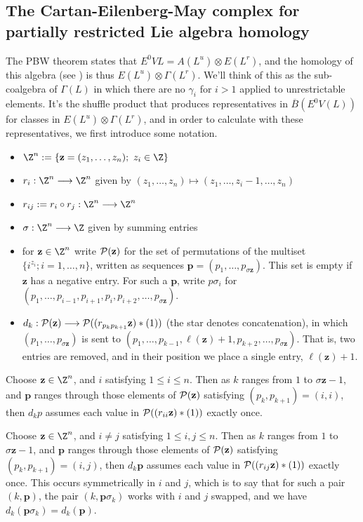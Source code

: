 \documentclass[11pt]{article}
\begin{document}
\begin{PRlieKoszulComplexCalculation}

\subsection{The Cartan-Eilenberg-May complex for partially restricted Lie algebra homology}
The PBW theorem states that $E^0VL=A(L^u)\otimes E(L^r)$, and the homology of this algebra (see \cite[\S7]{PriddyKoszul.pdf}) is thus $E(L^u)\otimes \Gamma(L^r)$. We'll think of this as the sub-coalgebra of $\Gamma(L)$ in which there are no $\gamma_i$ for $i>1$ applied to unrestrictable elements. It's the shuffle product that produces representatives in $\overline{B}(E^0V(L))$ for classes in $E(L^u)\otimes \Gamma(L^r)$, and in order to calculate with these representatives, we first introduce some notation.
\begin{itemize}
\setlength{\parindent}{.25in}
\item $\Z^n:=\{\textbf{z}=(z_1,\ldots,z_n);\ z_i\in\Z\}$
\item $r_i:\Z^n\to\Z^n$ given by $(z_1,\ldots,z_n)\mapsto(z_1,\ldots,z_i-1,\ldots,z_n)$
\item $r_{ij}:=r_i\circ r_j:\Z^n\to\Z^n$
\item $\sigma:\Z^n\to\Z$ given by summing entries
\item for $\textbf{z}\in\Z^n$ write $\mathcal{P}(\textbf{z})$ for the set of permutations of the multiset $\{i^{z_i};i=1,\ldots,n\}$, written as sequences $\textbf{p}=(p_1,\ldots,p_{\sigma \textbf{z}})$. This set is empty if $\textbf{z}$ has a negative entry. For such a $\textbf{p}$, write $p\sigma_i$ for $(p_1,\ldots,p_{i-1},p_{i+1},p_{i},p_{i+2},\ldots,p_{\sigma \textbf{z}})$.
\item $d_k:\mathcal{P}(\textbf{z})\longrightarrow\mathcal{P}((r_{p_kp_{k+1}}\textbf{z})*(1))$ (the star denotes concatenation), in which $(p_1,\ldots,p_{\sigma \textbf{z}})$ is sent to $(p_1,\ldots,p_{k-1},\ell(\textbf{z})+1,p_{k+2},\ldots,p_{\sigma \textbf{z}})$. That is, two entries are removed, and in their position we place a single entry, $\ell(\textbf{z})+1$.
\end{itemize}
\begin{prop*}
Choose $\textbf{z}\in\Z^n$, and $i$ satisfying $1\leq i\leq n$. Then as $k$ ranges from $1$ to $\sigma \textbf{z}-1$, and $\textbf{p}$ ranges through those elements of $\mathcal{P}(\textbf{z})$ satisfying $(p_k,p_{k+1})=(i,i)$, then $d_kp$ assumes each value in $\mathcal{P}((r_{ii}\textbf{z})*(1))$ exactly once.
\end{prop*}
\begin{prop*}
Choose $\textbf{z}\in\Z^n$, and $i\neq j$ satisfying $1\leq i,j\leq n$. Then as $k$ ranges from $1$ to $\sigma \textbf{z}-1$, and $\textbf{p}$ ranges through those elements of $\mathcal{P}(\textbf{z})$ satisfying $(p_k,p_{k+1})=(i,j)$, then $d_k\textbf{p}$ assumes each value in $\mathcal{P}((r_{ij}\textbf{z})*(1))$ exactly once. This occurs symmetrically in $i$ and $j$, which is to say that for such a pair $(k,\textbf{p})$, the pair $(k,\textbf{p}\sigma_k)$ works with $i$ and $j$ swapped, and we have $d_k(\textbf{p}\sigma_k)=d_k(\textbf{p})$.
\end{prop*}



\end{PRlieKoszulComplexCalculation}
\end{document}
